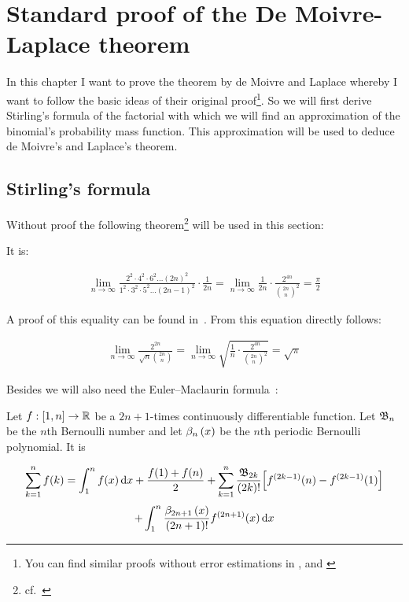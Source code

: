 \chapter{Standard proof of the De Moivre-Laplace theorem}

In this chapter I want to prove the theorem by de Moivre and Laplace whereby I want to follow the basic ideas of their original proof\footnote{You can find similar proofs without error estimations in \cite[pp. 64-67]{irle}, \cite[pp. 131-134]{georgii} and \cite{wiki:demoivrelaplace}}. So we will first derive Stirling's formula of the factorial with which we will find an approximation of the binomial's probability mass function. This approximation will be used to deduce de Moivre's and Laplace's theorem.

\section{Stirling's formula}

Without proof the following theorem\footnote{cf.~\cite[pp. 505, 63]{heuser}} will be used in this section:

\begin{theorem}
  It is:

  \begin{align}
    \lim_{n\to\infty} \frac{2^2\cdot4^2\cdot6^2\dots(2n)^2}{1^2\cdot3^2\cdot5^2\dots(2n-1)^2}\cdot \frac{1}{2n} = \lim_{n\to\infty} \frac{1}{2n} \cdot \frac{2^{4n}}{\binom{2n}{n}^2} = \frac{\pi}{2}
  \end{align}
\end{theorem}

\noindent A proof of this equality can be found in~\cite[pp. 504-505]{heuser}. From this equation directly follows: 

\begin{align} \label{wallis}
  \lim_{n\to\infty} \frac{2^{2n}}{\sqrt n \binom{2n}{n}} = \lim_{n\to\infty} \sqrt{\frac 1n \cdot \frac{2^{4n}}{\binom{2n}{n}^2}} = \sqrt \pi
\end{align}

\noindent Besides we will also need the Euler–Maclaurin formula~\cite[p. 226]{koenigsberger}:

\begin{theorem}
  Let $f:[1,n]\to\mathbb R$ be a $2n+1$-times continuously differentiable function. Let $\mathfrak{B}_{n}$ be the $n$th Bernoulli number and let $\beta_{n}\left({x}\right)$ be the $n$th periodic Bernoulli polynomial. It is

  \begin{multline} \label{euler-maclaurin-formula}
    \sum_{k=1}^n f(k) = \int_1^n f(x)\d{x} + \frac{f(1)+f(n)}{2} + \sum_{k=1}^n \frac{\bn[2k]}{(2k)!} \Big[f^{(2k-1)}(n) - f^{(2k-1)}(1)\Big] \nl
     + \int_1^n \frac{\bp[2n+1]{x}}{(2n+1)!} f^{(2n+1)}(x) \d{x}
  \end{multline}
\end{theorem}

